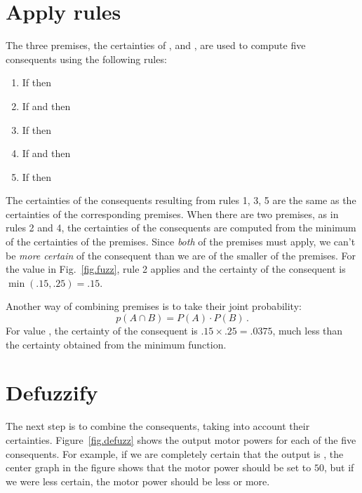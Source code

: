 \section{Apply rules}

The three premises, the certainties of ,  and , are used to compute five consequents using the following rules:

\begin{enumerate}
\item If  then 
\item If  and  then 
\item If  then 
\item If  and  then 
\item If  then 
\end{enumerate}

The certainties of the consequents resulting from rules 1, 3, 5 are the same as the certainties of the corresponding premises. When there are two premises, as in rules 2 and 4, the certainties of the consequents are computed from the minimum of the certainties of the premises. Since \emph{both} of the premises must apply, we can't be \emph{more certain} of the consequent than we are of the smaller of the premises. For the value  in Fig.~\ref{fig.fuzz}, rule 2 applies and the certainty of the consequent is $\min(.15,.25)=.15$.

Another way of combining premises is to take their joint probability:
\[
p(A \cap B) = P(A)\cdot P(B)\,.
\]
For value , the certainty of the consequent is $.15\times .25= .0375$, much less than the certainty obtained from the minimum function.

\section{Defuzzify}

The next step is to combine the consequents, taking into account their certainties. Figure~\ref{fig.defuzz} shows the output motor powers for each of the five consequents. For example, if we are completely certain that the output is , the center graph in the figure shows that the motor power should be set to $50$, but if we were less certain, the motor power should be less or more.


